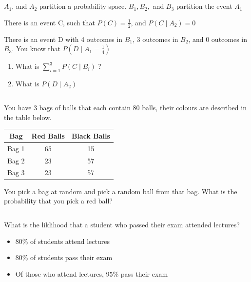 \documentclass[twocolumn]{article}
\begin{document}
\subsection{}

    $A_1$, and $A_2$ partition a probability space. $B_1, B_2,$ and $B_3$ partition the event $A_1$

    There is an event C, such that $P(C) = \frac{1}{2}$, and $P(C \mid A_2) = 0$
    
    There is an event D with 4 outcomes in $B_1$, 3 outcomes in $B_2$, and 0 outcomes in $B_3$. You know that $P (D \mid A_1 = \frac{1}{4})$

    \begin{enumerate}
        \item What is $\sum_{i=1}^3 P(C \mid B_i) $ ?
        \item What is $P(D \mid A_2)$
    \end{enumerate}
    
\subsection{}

    You have 3 bags of balls that each contain 80 balls, their colours are described in the table below.

    \begin{table}[h!]
        \centering
        \begin{tabular}{c | c | c }
            \toprule
            Bag & Red Balls & Black Balls \\
            \midrule
            Bag 1 & 65 & 15  \\
            Bag 2 & 23 & 57  \\
            Bag 3 & 23 & 57 \\
            \bottomrule
        \end{tabular}
    \end{table}

    You pick a bag at random and pick a random ball from that bag. What is the probability that you pick a red ball?

\subsection{}

    What is the liklihood that a student who passed their exam attended lectures?

    \begin{itemize}
        \item 80\% of students attend lectures
        \item 80\% of students pass their exam
        \item Of those who attend lectures, 95\% pass their exam
    \end{itemize}
    
\end{document}
